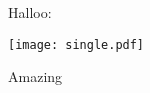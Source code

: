 \documentclass{article}
\begin{document}
Halloo:
\begin{center}
  \texttt{[image: single.pdf]}
\end{center}

\begin{sirius-draw}[start-year=2025,offsets=-.33 -.33 .2 -.33]{Amazing}
\end{sirius-draw}
\end{document}
